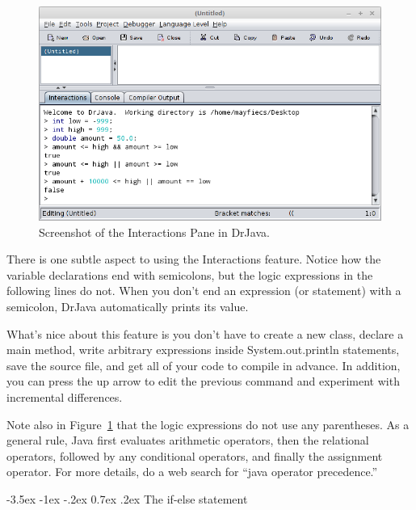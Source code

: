 \documentclass[12pt]{book}
\makeatletter
\renewcommand{\section}{\@startsection {section}{1}{\z@}%
    {-3.5ex \@plus -1ex \@minus -.2ex}%
    {0.7ex \@plus.2ex}%
    {\normalfont\Large\bfseries}}
\theoremstyle{exercise}
\makeatother
\begin{document}
\begin{figure}[!h]
\begin{center}
\includegraphics[width=\textwidth]{figs/drjava-logic.png}
\caption{Screenshot of the Interactions Pane in DrJava.}
\label{fig:drjava}
\end{center}
\end{figure}

There is one subtle aspect to using the Interactions feature.
Notice how the variable declarations end with semicolons, but the logic expressions in the following lines do not.
When you don't end an expression (or statement) with a semicolon, DrJava automatically prints its value.

What's nice about this feature is you don't have to create a new class, declare a main method, write arbitrary expressions inside System.out.println statements, save the source file, and get all of your code to compile in advance.
In addition, you can press the up arrow to edit the previous command and experiment with incremental differences.


Note also in Figure~\ref{fig:drjava} that the logic expressions do not use any parentheses.
As a general rule, Java first evaluates arithmetic operators, then the relational operators, followed by any conditional operators, and finally the assignment operator.
For more details, do a web search for ``java operator precedence.''


\section{The if-else statement}

\end{document}
